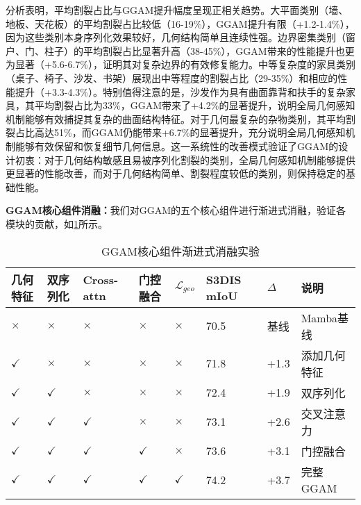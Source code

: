 \documentclass[preprint,12pt]{elsarticle}
\begin{document}
分析表明，平均割裂占比与GGAM提升幅度呈现正相关趋势。大平面类别（墙、地板、天花板）的平均割裂占比较低（16-19\%），GGAM提升有限（+1.2-1.4\%），因为这些类别本身序列化效果较好，几何结构简单且连续性强。边界密集类别（窗户、门、柱子）的平均割裂占比显著升高（38-45\%），GGAM带来的性能提升也更为显著（+5.6-6.7\%），证明其对复杂边界的有效修复能力。中等复杂度的家具类别（桌子、椅子、沙发、书架）展现出中等程度的割裂占比（29-35\%）和相应的性能提升（+3.3-4.3\%）。特别值得注意的是，沙发作为具有曲面靠背和扶手的复杂家具，其平均割裂占比为33\%，GGAM带来了+4.2\%的显著提升，说明全局几何感知机制能够有效捕捉其复杂的曲面结构特征。对于几何最复杂的杂物类别，其平均割裂占比高达51\%，而GGAM仍能带来+6.7\%的显著提升，充分说明全局几何感知机制能够有效保留和恢复细节几何信息。这一系统性的改善模式验证了GGAM的设计初衷：对于几何结构敏感且易被序列化割裂的类别，全局几何感知机制能够提供更显著的性能改善，而对于几何结构简单、割裂程度较低的类别，则保持稳定的基础性能。


\textbf{GGAM核心组件消融：}我们对GGAM的五个核心组件进行渐进式消融，验证各模块的贡献，如\cref{tab:ggam_full_ablation}所示。

\begin{table}[htbp!]
	\centering
	\caption{GGAM核心组件渐进式消融实验}
	\label{tab:ggam_full_ablation}
	\begin{tabular}{@{}llllllll@{}}
		\toprule
		几何特征 & 双序列化 & Cross-attn & 门控融合 & $\mathcal{L}_{geo}$ & S3DIS mIoU & $\Delta$ & 说明 \\ 
		\midrule
		$\times$ & $\times$ & $\times$ & $\times$ & $\times$ & 70.5 & 基线 & Mamba基线 \\
		\midrule
		$\checkmark$ & $\times$ & $\times$ & $\times$ & $\times$ & 71.8 & +1.3 & 添加几何特征 \\
		$\checkmark$ & $\checkmark$ & $\times$ & $\times$ & $\times$ & 72.4 & +1.9 & 双序列化 \\
		$\checkmark$ & $\checkmark$ & $\checkmark$ & $\times$ & $\times$ & 73.1 & +2.6 & 交叉注意力 \\
		$\checkmark$ & $\checkmark$ & $\checkmark$ & $\checkmark$ & $\times$ & 73.6 & +3.1 & 门控融合 \\
		$\checkmark$ & $\checkmark$ & $\checkmark$ & $\checkmark$ & $\checkmark$ & 74.2 & +3.7 & 完整GGAM \\
		\bottomrule
	\end{tabular}
\end{table}
\end{document}
